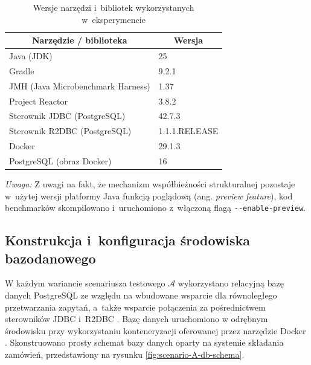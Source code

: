 \setlength{\tabcolsep}{0.5em}
\renewcommand{\arraystretch}{1.2}
\begin{table}[h!]
    \centering
    \begin{tabular}{|l|l|}
        \hline
        \multicolumn{1}{|c|}{\textbf{Narzędzie / biblioteka}} & \multicolumn{1}{c|}{\textbf{Wersja}} \\
        \hline
        Java (JDK) & 25 \\
        \hline
        Gradle & 9.2.1 \\
        \hline
        JMH (Java Microbenchmark Harness) & 1.37 \\
        \hline
        Project Reactor & 3.8.2 \\
        \hline
        Sterownik JDBC (PostgreSQL) & 42.7.3 \\
        \hline
        Sterownik R2DBC (PostgreSQL) & 1.1.1.RELEASE \\
        \hline
        Docker & 29.1.3 \\
        \hline
        PostgreSQL (obraz Docker) & 16 \\
        \hline
    \end{tabular}
    \caption{Wersje narzędzi i~bibliotek wykorzystanych w~eksperymencie}
    \label{table:software-env}
\end{table}

\noindent
\textit{Uwaga:} Z uwagi na fakt, że mechanizm współbieżności strukturalnej pozostaje w~użytej wersji platformy Java funkcją poglądową (ang. \textit{preview feature}), kod benchmarków skompilowano i~uruchomiono z~włączoną flagą \texttt{{-}{-}enable-preview}.

\newpage
\subsection{Konstrukcja i~konfiguracja środowiska bazodanowego}
\label{sec:scenario-A-database}

W każdym wariancie scenariusza testowego $\mathcal{A}$ wykorzystano relacyjną bazę danych PostgreSQL ze względu na wbudowane wsparcie dla równoległego przetwarzania zapytań, a~także wsparcie połączenia za pośrednictwem sterowników JDBC i~R2DBC \cite{postgresql-site}. Bazę danych uruchomiono w odrębnym środowisku przy wykorzystaniu konteneryzacji oferowanej przez narzędzie Docker \cite{docker-containers}. Skonstruowano prosty schemat bazy danych oparty na systemie składania zamówień, przedstawiony na rysunku \ref{fig:scenario-A-db-schema}.

